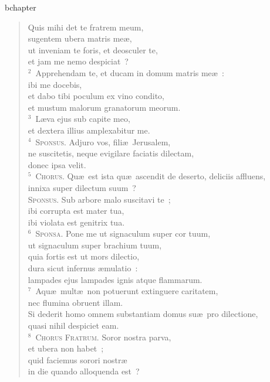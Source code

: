 bchapter\begin{verse}\vspace{-19pt}Quis mihi det te fratrem meum,\\ sugentem ubera matris me\ae ,\\ ut inveniam te foris, et deosculer te,\\ et jam me nemo despiciat~?\\
${}^{2}$~Apprehendam te, et ducam in domum matris me\ae~:\\ ibi me docebis,\\ et dabo tibi poculum ex vino condito,\\ et mustum malorum granatorum meorum.\\
${}^{3}$~L\ae va ejus sub capite meo,\\ et dextera illius amplexabitur me.\\
${}^{4}$~\textsc{Sponsus.} Adjuro vos, fili\ae\ Jerusalem,\\ ne suscitetis, neque evigilare faciatis dilectam,\\ donec ipsa velit.\\
${}^{5}$~\textsc{Chorus.} Qu\ae\ est ista qu\ae\ ascendit de deserto, deliciis affluens,\\ innixa super dilectum suum~?\\ \textsc{Sponsus.} Sub arbore malo suscitavi te~;\\ ibi corrupta est mater tua,\\ ibi violata est genitrix tua.\\
${}^{6}$~\textsc{Sponsa.} Pone me ut signaculum super cor tuum,\\ ut signaculum super brachium tuum,\\ quia fortis est ut mors dilectio,\\ dura sicut infernus \ae mulatio~:\\ lampades ejus lampades ignis atque flammarum.\\
${}^{7}$~Aqu\ae\ mult\ae\ non potuerunt extinguere caritatem,\\ nec flumina obruent illam.\\ Si dederit homo omnem substantiam domus su\ae\ pro dilectione,\\ quasi nihil despiciet eam.\\
${}^{8}$~\textsc{Chorus Fratrum.} Soror nostra parva,\\ et ubera non habet~;\\ quid faciemus sorori nostr\ae \\ in die quando alloquenda est~?\\

\end{verse}
